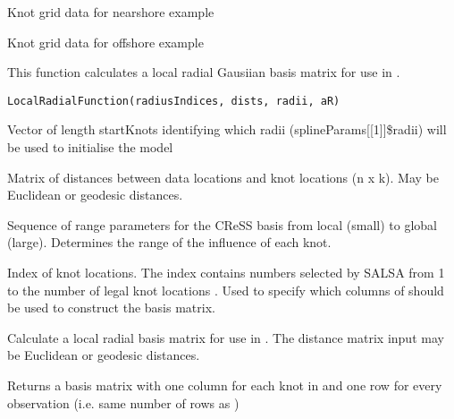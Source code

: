 \documentclass[a4paper]{book}
\begin{document}
%
\begin{Description}\relax
Knot grid data for nearshore example
\end{Description}
%
\begin{Description}\relax
Knot grid data for offshore example
\end{Description}
%
\begin{Description}\relax
This function calculates a local radial Gausiian basis matrix for use in .
\end{Description}
%
\begin{Usage}
\begin{verbatim}
LocalRadialFunction(radiusIndices, dists, radii, aR)
\end{verbatim}
\end{Usage}
%
\begin{Arguments}
\begin{ldescription}
\item[\code{radiusIndices}] Vector of length startKnots identifying which radii (splineParams[[1]]\$radii) will be used to initialise the model

\item[\code{dists}] Matrix of distances between data locations and knot locations (n x k). May be Euclidean or geodesic distances.

\item[\code{radii}] Sequence of range parameters for the CReSS basis from local (small) to global (large). Determines the range of the influence of each knot.

\item[\code{aR}] Index of knot locations. The index contains numbers selected by SALSA from 1 to the number of legal knot locations . Used to specify which columns of  should be used to construct the basis matrix.
\end{ldescription}
\end{Arguments}
%
\begin{Details}\relax
Calculate a local radial basis matrix for use in .  The distance matrix input may be Euclidean or geodesic distances.
\end{Details}
%
\begin{Value}
Returns a basis matrix with one column for each knot in  and one row for every observation (i.e. same number of rows as )
\end{Value}
\end{document}
